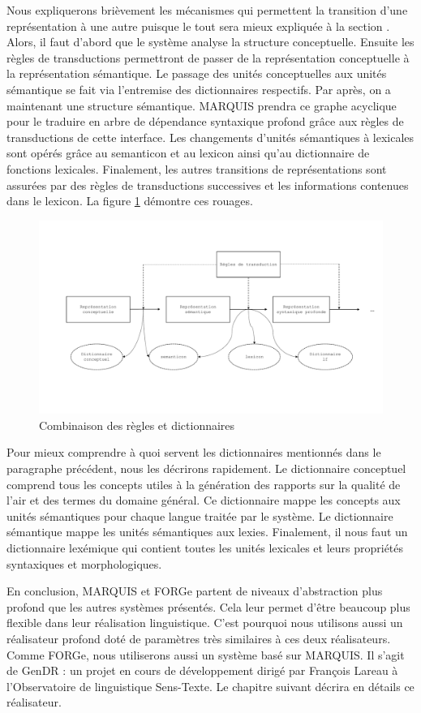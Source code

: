 Nous expliquerons brièvement les mécanismes qui permettent la transition d'une représentation à une autre puisque le tout sera mieux expliquée à la section . Alors, il faut d'abord que le système analyse la structure conceptuelle. Ensuite les règles de transductions permettront de passer de la représentation conceptuelle à la représentation sémantique. Le passage des unités conceptuelles aux unités sémantique se fait via l'entremise des dictionnaires respectifs. Par après, on a maintenant une structure sémantique. MARQUIS prendra ce graphe acyclique pour le traduire en arbre de dépendance syntaxique profond grâce aux règles de transductions de cette interface. Les changements d'unités sémantiques à lexicales sont opérés grâce au semanticon et au lexicon ainsi qu'au dictionnaire de fonctions lexicales. Finalement, les autres transitions de représentations sont assurées par des règles de transductions successives et les informations contenues dans le lexicon. La figure \ref{fig:reglesdict} démontre ces rouages.
\begin{figure}[htb]
	\centering
	\includegraphics[width=1\textwidth, trim = {0cm 0cm 0cm 0cm},clip]{ch2/figs/module.pdf}
	\caption{Combinaison des règles et dictionnaires}
	\label{fig:reglesdict}
\end{figure}

Pour mieux comprendre à quoi servent les dictionnaires mentionnés dans le paragraphe précédent, nous les décrirons rapidement. Le dictionnaire conceptuel comprend tous les concepts utiles à la génération des rapports sur la qualité de l'air et des termes du domaine général. Ce dictionnaire mappe les concepts aux unités sémantiques pour chaque langue traitée par le système. Le dictionnaire sémantique mappe les unités sémantiques aux lexies. Finalement, il nous faut un dictionnaire lexémique qui contient toutes les unités lexicales et leurs propriétés syntaxiques et morphologiques.

En conclusion, MARQUIS et FORGe partent de niveaux d'abstraction plus profond que les autres systèmes présentés. Cela leur permet d'être beaucoup plus flexible dans leur réalisation linguistique. C'est pourquoi nous utilisons aussi un réalisateur profond doté de paramètres très similaires à ces deux réalisateurs. Comme FORGe, nous utiliserons aussi un système basé sur MARQUIS. Il s'agit de GenDR \citep{lareau18}: un projet en cours de développement dirigé par François Lareau à l’Observatoire de linguistique Sens-Texte. Le chapitre suivant décrira en détails ce réalisateur.